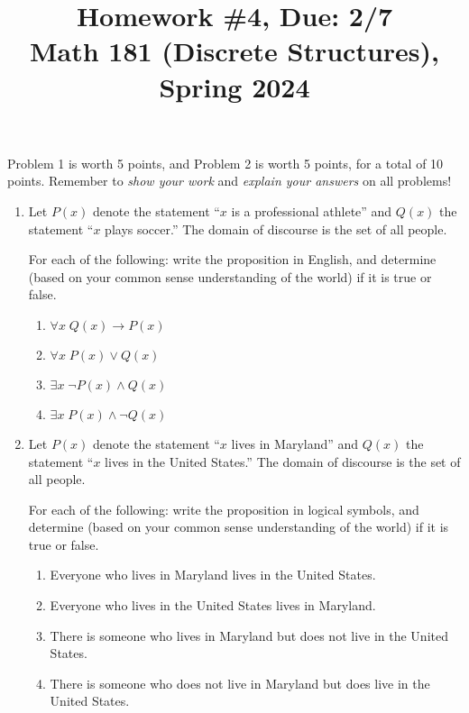 \documentclass[11pt]{article}
\title{Homework \#4, Due: 2/7 \\Math 181 (Discrete Structures), Spring 2024}
\date{}
\begin{document}
\maketitle

\thispagestyle{empty}

\vspace{-1cm}

Problem 1 is worth 5 points, and Problem 2 is worth 5 points, for a total of 10 points. Remember to \emph{show your work} and \emph{explain your answers} on all problems!

\begin{enumerate}
\item Let $P(x)$ denote the statement ``$x$ is a professional athlete'' and $Q(x)$ the statement ``$x$ plays soccer.'' The domain of discourse is the set of all people. 

For each of the following: write the proposition in English, and determine (based on your common sense understanding of the world) if it is true or false.
\begin{enumerate}
\item $\forall x \; Q(x) \to P(x)$
\item $\forall x \; P(x) \vee Q(x)$
\item $\exists x \; \neg P(x) \wedge Q(x)$
\item $\exists x \; P(x) \wedge \neg Q(x)$
\end{enumerate}

\item Let $P(x)$ denote the statement ``$x$ lives in Maryland'' and $Q(x)$ the statement ``$x$ lives in the United States.'' The domain of discourse is the set of all people. 

For each of the following: write the proposition in logical symbols, and determine (based on your common sense understanding of the world) if it is true or false.
\begin{enumerate}
\item Everyone who lives in Maryland lives in the United States.
\item Everyone who lives in the United States lives in Maryland.
\item There is someone who lives in Maryland but does not live in the United States.
\item There is someone who does not live in Maryland but does live in the United States.
\end{enumerate}

\end{enumerate}
\end{document}
